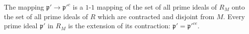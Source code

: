 The mapping $\mathfrak{p}' \to \mathfrak{p}'^{c}$ is a $1$-$1$ mapping of the set of all prime ideals of $R_M$ onto the set of all prime ideals of $R$ which are contracted and disjoint from $M$. Every prime ideal $\mathfrak{p}'$ in $R_M$ is the extension of its contraction: $\mathfrak{p}' = \mathfrak{p}'^{ce}$.
